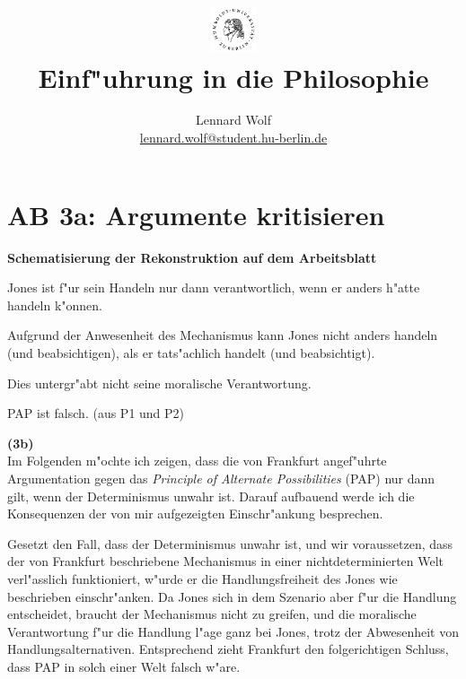 \documentclass[a4paper]{article}
\date{\vspace{-3ex}}
\begin{document}
\title{
    \vspace{-30pt}
	\includegraphics*[width=0.1\textwidth,left]{images/hu_logo2.png}\\
	\vspace{-10pt}
	Einf"uhrung in die Philosophie}
\author{Lennard Wolf\\
        \small{\href{mailto:lennard.wolf@student.hu-berlin.de}{lennard.wolf@student.hu-berlin.de}}}
\maketitle
\vspace{0pt}

\section*{AB 3a: Argumente kritisieren}
\large
\vspace{2pt}
\textbf{Sche­ma­ti­sie­rung der Rekonstruktion auf dem Arbeitsblatt}
\begin{description}[leftmargin=!,labelwidth=\widthof{\bfseries (P21)}]
  \item[PAP] Jones ist f"ur sein Handeln nur dann verantwortlich, wenn er anders h"atte handeln k"onnen.
  \item[P1] Aufgrund der Anwesenheit des Mechanismus kann Jones nicht anders handeln (und beabsichtigen), als er tats"achlich handelt (und beabsichtigt).
  \item[P2] Dies untergr"abt nicht seine moralische Verantwortung.
  \item[K] PAP ist falsch. (aus P1 und P2)
\end{description}
\vspace{10pt}
\textbf{(3b)}
\vspace{8pt}
\\
Im Folgenden m"ochte ich zeigen, dass die von Frankfurt angef"uhrte Argumentation gegen das \emph{Principle of Alternate Possibilities} (PAP) nur dann gilt, wenn der Determinismus unwahr ist. Darauf aufbauend werde ich die Konsequenzen der von mir aufgezeigten Einschr"ankung besprechen.

Gesetzt den Fall, dass der Determinismus unwahr ist, und wir voraussetzen, dass der von Frankfurt beschriebene Mechanismus in einer nichtdeterminierten Welt verl"asslich funktioniert, w"urde er die Handlungsfreiheit des Jones wie beschrieben einschr"anken. Da Jones sich in dem Szenario aber f"ur die Handlung entscheidet, braucht der Mechanismus nicht zu greifen, und die moralische Verantwortung f"ur die Handlung l"age ganz bei Jones, trotz der Abwesenheit von Handlungsalternativen. Entsprechend zieht Frankfurt den folgerichtigen Schluss, dass PAP in solch einer Welt falsch w"are.
\end{document}

